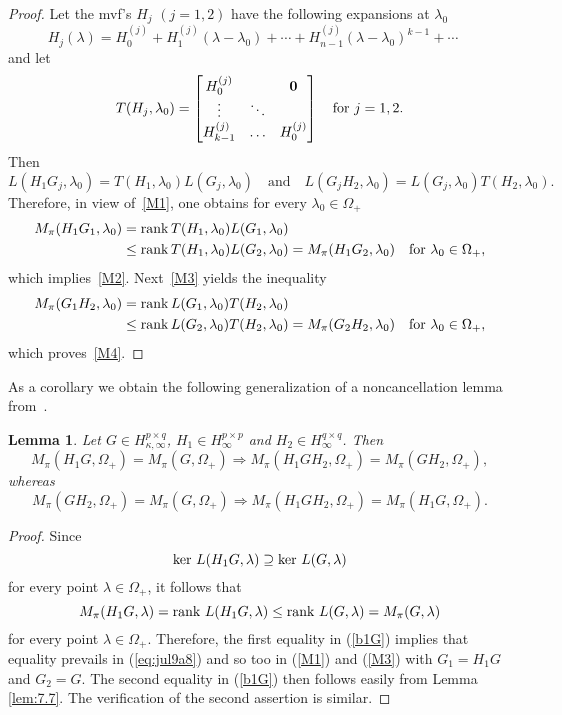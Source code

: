 \documentclass[12pt,twoside,a4paper]{amsart}
\newtheorem{lem}[thm]{Lemma}
\theoremstyle{definition}
\numberwithin{equation}{section}
\begin{document}
\begin{proof}
Let the mvf's $H_j$ $(j=1,2)$ have the following expansions at
$\lambda_0$
\[
   H_j({\lambda})=H_0^{(j)}+H_1^{(j)}(\lambda-\lambda_0)+\cdots
+H_{n-1}^{(j)}(\lambda-\lambda_0)^{k-1}+\cdots
   \quad
\]
and let
\[
T({H_j},{\lambda}_0)=\begin{bmatrix}
  H_0^{(j)} &  & {\bf 0} \\
  \vdots & \ddots &  \\
  H_{k-1}^{(j)} &\hdots & H_0^{(j)}
\end{bmatrix} \quad \text{for}\ j=1,2.
\]
 Then
$$
    L(H_1G_j,{\lambda}_0)=T(H_1,\lambda_0)L(G_j,{\lambda}_0)\quad\text{and}\quad
    L(G_jH_2,{\lambda}_0)=L(G_j,{\lambda}_0)T(H_2,{\lambda}_0).
$$
Therefore,  in view of~\eqref{M1},  one obtains for every
$\lambda_0\in\Omega_+$
\[
\begin{split}
M_{\pi} (H_1G_1, \lambda_0)&={{\rm rank\,}} T(H_1,\lambda_0)L(G_1,{\lambda}_0)\\
&\le  {{\rm rank\,}} T(H_1,\lambda_0)L(G_2,{\lambda}_0)= M_{\pi} (H_1G_2,
{\lambda}_0)\quad\text{for}\ \lambda_0\in\Omega_+,
\end{split}
\]
which implies~\eqref{M2}. Next~\eqref{M3} yields the inequality
\[
\begin{split}
M_{\pi} (G_1H_2, \lambda_0)&={{\rm rank\,}} L(G_1,{\lambda}_0)T(H_2,{\lambda}_0)\\
&\le  {{\rm rank\,}} L(G_2,{\lambda}_0)T(H_2,{\lambda}_0)=M_{\pi} (G_2H_2, {\lambda}_0)
\quad\text{for}\ \lambda_0\in\Omega_+,
\end{split}
\]
which proves~\eqref{M4}.
\end{proof}
As a corollary we obtain the following generalization of a noncancellation
lemma from~\cite{Der03}.
\begin{lem}\label{lem:5.4}
Let $G\in H_{\kappa,\infty}^{p\times q}$, $H_1\in
H_{\infty}^{p\times p}$ and $H_2\in H_{\infty}^{q\times q}$. Then
\begin{equation}\label{b1G}
    M_\pi(H_1G,\Omega_+)=M_\pi(G,\Omega_+)\Longrightarrow
M_\pi(H_1GH_2,\Omega_+)=M_\pi(GH_2,\Omega_+),
\end{equation}
whereas
\begin{equation}\label{Gb2}
    M_\pi(GH_2,\Omega_+)=M_\pi(G,\Omega_+)\Longrightarrow
M_\pi(H_1GH_2,\Omega_+)=M_\pi(H_1G,\Omega_+).
\end{equation}
\end{lem}

\begin{proof}
Since
$$
\textup{ker }L(H_1G, \lambda)\supseteq \textup{ker }L(G,\lambda)
$$
for every point $\lambda\in\Omega_+$, it follows that
\begin{equation}
\label{eq:jul9a8} M_\pi(H_1G,\lambda)=\textup{rank
}L(H_1G,\lambda)\le \textup{rank }L(G,\lambda)=M_\pi(G,\lambda)
\end{equation}
for every point $\lambda\in\Omega_+$. Therefore, the first equality in
(\ref{b1G})
implies that
equality prevails in (\ref{eq:jul9a8}) and so too in (\ref{M1}) and
(\ref{M3}) with $G_1=H_1G$ and $G_2=G$. The
second equality in  (\ref{b1G}) then follows easily from Lemma
\ref{lem:7.7}. The verification of the
second assertion is similar.
\end{proof}
\end{document}
